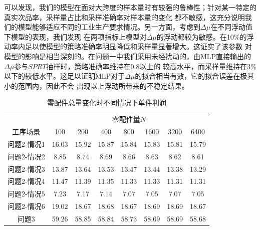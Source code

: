 \documentclass[withoutpreface,bwprint]{cumcmthesis} %
\begin{document}
可以发现，我们的模型在面对大跨度的样本量时有较强的鲁棒性；针对某一特定的真实次品率，采样量占比和采样准确率对样本量的变化
都不敏感，这充分说明我们的模型能够适应不同的工业生产要求情况。另一方面，考虑到$\Delta \mu$在不同浮动值下模型的表现，我们发现
在两项指标上模型对$\Delta \mu$的浮动都较为敏感。在10\%的浮动率内足以使模型的策略准确率明显降低和采样量显著增大。这证实了该参数
对模型的影响是相当深刻的。在问题一中我们采用未经扰动的，由MLP直接输出的$\Delta \mu$参与$SPRT$抽样时，策略准确率维持在0.8以上的
较高水平，而采样量维持在3\%以下的较低水平。这足以证明MLP对于$\Delta \mu$的拟合相当有效，它的拟合误差在极其小的范围内，因此不会
出现以上浮动所带来的不稳定结果。
\begin{table}[htbp]
    \centering
    \renewcommand\arraystretch{1.0}
    \setlength\tabcolsep{16pt}
    \footnotesize
    \begin{tabular}{c|c|c|c|c|c|c|c}
        \hline
                & \multicolumn{7}{c}{零配件量$N$}                                                 \\
        \cline{2-8}
        工序场景    & 100                         & 200   & 400   & 800   & 1600  & 3200  & 6400  \\
        \hline
        问题2-情况1 & 16.03                       & 15.92 & 15.87 & 15.84 & 15.83 & 15.81 & 15.79 \\
        问题2-情况2 & 8.85                        & 8.74  & 8.69  & 8.66  & 8.63  & 8.62  & 8.61  \\
        问题2-情况3 & 13.87                       & 13.64 & 13.53 & 13.47 & 13.44 & 13.38 & 13.29 \\
        问题2-情况4 & 11.47                       & 11.39 & 11.35 & 11.33 & 11.33 & 11.31 & 11.31 \\
        问题2-情况5 & 7.23                        & 7.17  & 7.14  & 7.07  & 7.05  & 7.07  & 7.05  \\
        问题2-情况6 & 19.02                       & 18.67 & 18.68 & 18.67 & 18.69 & 18.69 & 18.67 \\
        问题3     & 59.26                       & 58.85 & 58.84 & 58.73 & 58.69 & 58.69 & 58.68 \\
        \hline
    \end{tabular}
    \caption{零配件总量变化时不同情况下单件利润}
    \label{pro2_sensi}
\end{table}
\end{document}
